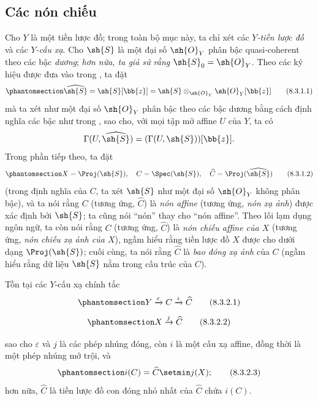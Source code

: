 \documentclass[oneside,10pt]{amsart}
\newcommand{\oldpage}[2][]{\marginnote{\normalfont\footnotesize\textbf{#1}~|~#2}\ignorespaces}
\let\EGAOriginalLabel\label
\renewcommand{\label}[1]{\phantomsection\EGAOriginalLabel{#1}}
\begin{document}
\subsection{Các nón chiếu}
\label{subsection:II.8.3}

\begin{env}[8.3.1]
\label{II.8.3.1}
Cho $Y$ là một tiền lược đồ;
trong toàn bộ mục này, ta chỉ xét các \emph{$Y$-tiền lược đồ} và các \emph{$Y$-cấu xạ}.
Cho $\sh{S}$ là một đại số $\sh{O}_Y$ phân bậc quasi-coherent theo các bậc \emph{dương};
\emph{hơn nữa, ta giả sử rằng $\sh{S}_0=\sh{O}_Y$}.
Theo các ký hiệu được đưa vào trong , ta đặt
\[
\label{II.8.3.1.1}
  \widehat{\sh{S}} = \sh{S}[\bb{z}] = \sh{S} \otimes_{\sh{O}_Y} \sh{O}_Y[\bb{z}]
\tag{8.3.1.1}
\]
mà ta xét như một đại số $\sh{O}_Y$ phân bậc theo các bậc dương bằng cách định nghĩa các bậc như trong , sao cho, với mọi tập mở affine $U$ của $Y$, ta có
\[
  \Gamma(U,\widehat{\sh{S}}) = (\Gamma(U,\sh{S}))[\bb{z}].
\]
Trong phần tiếp theo, ta đặt
\[
\label{II.8.3.1.2}
  X = \Proj(\sh{S}),
  \quad
  C = \Spec(\sh{S}),
  \quad
  \widehat{C} = \Proj(\widehat{\sh{S}})
\tag{8.3.1.2}
\]
(trong định nghĩa của $C$, ta xét $\sh{S}$ như một đại số $\sh{O}_Y$ không phân bậc), và ta nói rằng $C$ (tương ứng, $\widehat{C}$) là \emph{nón affine} (tương ứng, \emph{nón xạ ảnh}) được xác định bởi $\sh{S}$;
ta cũng nói ``nón'' thay cho ``nón affine''.
Theo lối lạm dụng ngôn ngữ, ta còn nói rằng $C$ (tương ứng, $\widehat{C}$) là \emph{nón chiếu affine của $X$} (tương ứng, \emph{nón chiếu xạ ảnh của $X$}), ngầm hiểu rằng tiền lược đồ $X$ được cho dưới dạng $\Proj(\sh{S})$;
cuối cùng, ta nói rằng $\widehat{C}$ là \emph{bao đóng xạ ảnh} của $C$ (ngầm hiểu rằng dữ liệu $\sh{S}$ nằm trong cấu trúc của $C$).
\end{env}
\begin{proposition}[8.3.2]
\label{II.8.3.2}
Tồn tại các $Y$-cấu xạ chính tắc
\[
\label{II.8.3.2.1}
  Y \xrightarrow{\varepsilon} C \xrightarrow{i} \widehat{C}
\tag{8.3.2.1}
\]
\[
\label{II.8.3.2.2}
  X \xrightarrow{j} \widehat{C}
\tag{8.3.2.2}
\]

\oldpage[II]{163}
sao cho $\varepsilon$ và $j$ là các phép nhúng đóng, còn $i$ là một cấu xạ affine, đồng thời là một phép nhúng mở trội, và
\[
\label{II.8.3.2.3}
  i(C) = \widehat{C}\setmin j(X);
\tag{8.3.2.3}
\]
hơn nữa, $\widehat{C}$ là tiền lược đồ con đóng nhỏ nhất của $\widehat{C}$ chứa $i(C)$.
\end{proposition}
\end{document}
